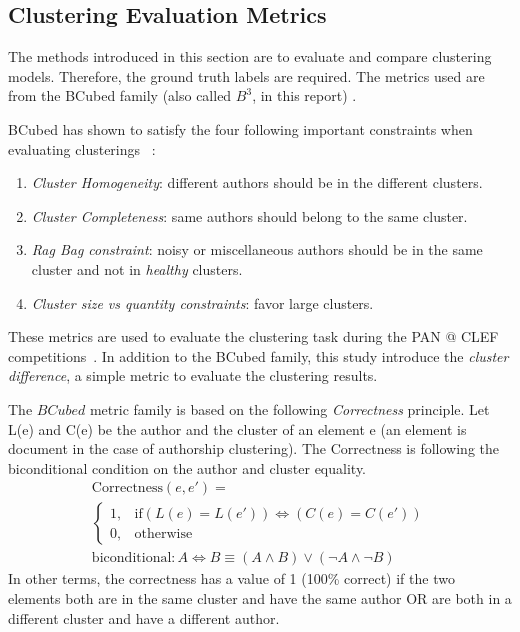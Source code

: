 \subsection{Clustering Evaluation Metrics \label{sec:clustering_evaluation_meterics}}

The methods introduced in this section are to evaluate and compare clustering models.
Therefore, the ground truth labels are required.
The metrics used are from the BCubed family (also called $B^3$, in this report) \cite{bcubed}.

BCubed has shown to satisfy the four following important constraints when evaluating clusterings \cite{bcubed}~:

\begin{enumerate}
  \item
  \textit{Cluster Homogeneity}: different authors should be in the different clusters.
  \item
  \textit{Cluster Completeness}: same authors should belong to the same cluster.
  \item
  \textit{Rag Bag constraint}: noisy or miscellaneous authors should be in the same cluster and not in \textit{healthy} clusters.
  \item
  \textit{Cluster size vs quantity constraints}: favor large clusters.
\end{enumerate}

These metrics are used to evaluate the clustering task during the PAN @ CLEF competitions~\cite{pan16}.
In addition to the BCubed family, this study introduce the \textit{cluster difference}, a simple metric to evaluate the clustering results.

\begin{definition}
  The $BCubed$ metric family is based on the following \textit{Correctness} principle.
  Let L(e) and C(e) be the author and the cluster of an element e (an element is document in the case of authorship clustering).
  The Correctness is following the biconditional condition on the author and cluster equality.
  \begin{gather*}
    \mathrm{Correctness}(e, e') = \\
    \begin{cases}
      1, & \mathrm{if} (L(e) = L(e')) \Longleftrightarrow (C(e) = C(e'))\\
      0, & \mathrm{otherwise}
    \end{cases} \\
    \mathrm{biconditional}: A \Longleftrightarrow B \equiv (A \land B) \lor (\neg A \land \neg B)
  \end{gather*}
  In other terms, the correctness has a value of 1 (100\% correct) if the two elements both are in the same cluster and have the same author OR are both in a different cluster and have a different author.
\end{definition}

